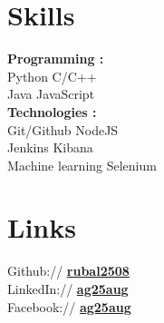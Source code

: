 \documentclass[]{deedy-resume-reversed}
\begin{document}
\begin{minipage}[t]{0.33\textwidth}
\sectionsep



\section{Skills}
\textbf{Programming :}\\
Python \textbullet{} C/C++ \\
Java \textbullet{} JavaScript \\
\sectionsep
\textbf{Technologies :}\\
Git/Github \textbullet{} NodeJS\\
Jenkins \textbullet{} Kibana\\
Machine learning \textbullet{} Selenium \\
\sectionsep



\section{Links}
Github:// \href{https://github.com/rubal2508}{\bf rubal2508} \\
LinkedIn://  \href{https://www.linkedin.com/in/ag25aug}{\bf ag25aug} \\
Facebook:// \href{https://www.facebook.com/ag25aug/}{\bf ag25aug}
\sectionsep

\end{minipage}
\end{document}
